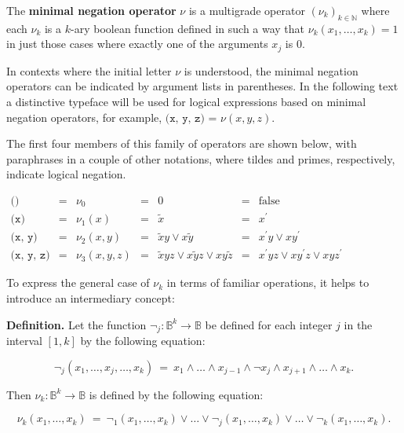\documentclass[12pt]{article}
\begin{document}

The \textbf{minimal negation operator} $\nu$ is a multigrade operator $(\nu_k)_{k \in \mathbb{N}}$ where each $\nu_k$ is a $k$-ary boolean function defined in such a way that $\nu_k (x_1, \ldots, x_k) = 1$ in just those cases where exactly one of the arguments $x_j$ is $0$.

In contexts where the initial letter $\nu$ is understood, the minimal negation operators can be indicated by argument lists in parentheses.  In the following text a distinctive typeface will be used for logical expressions based on minimal negation operators, for example, $\texttt{(x, y, z)}$ = $\nu (x, y, z).$

The first four members of this family of operators are shown below, with paraphrases in a couple of other notations, where tildes and primes, respectively, indicate logical negation.

\begin{center}$\begin{matrix}
\texttt{()}
& = & \nu_0
& = & 0
& = & \operatorname{false}
\\[6pt]
\texttt{(x)}
& = & \nu_1 (x)
& = & \tilde{x}
& = & x^\prime
\\[6pt]
\texttt{(x, y)}
& = & \nu_2 (x, y)
& = & \tilde{x}y \lor x\tilde{y}
& = & x^\prime y \lor x y^\prime
\\[6pt]
\texttt{(x, y, z)}
& = & \nu_3 (x, y, z)
& = & \tilde{x}yz \lor x\tilde{y}z \lor xy\tilde{z}
& = & x^\prime y z \lor x y^\prime z \lor x y z^\prime
\end{matrix}$\end{center}

To express the general case of $\nu_k$ in terms of familiar operations, it helps to introduce an intermediary concept:

\textbf{Definition.}  Let the function $\lnot_j : \mathbb{B}^k \to \mathbb{B}$ be defined for each integer $j$ in the interval $[1, k]$ by the following equation:

\[ \lnot_j (x_1, \ldots, x_j, \ldots, x_k) ~=~ x_1 \land \ldots \land x_{j-1} \land \lnot x_j \land x_{j+1} \land \ldots \land x_k. \]

Then $\nu_k : \mathbb{B}^k \to \mathbb{B}$ is defined by the following equation:

\[ \nu_k (x_1, \ldots, x_k) ~=~ \lnot_1 (x_1, \ldots, x_k) \lor \ldots \lor \lnot_j (x_1, \ldots, x_k) \lor \ldots \lor \lnot_k (x_1, \ldots, x_k). \]
\end{document}
